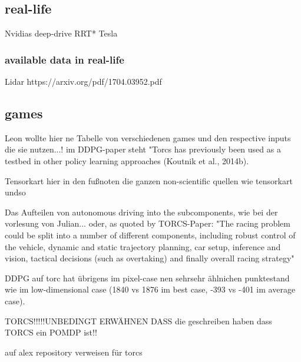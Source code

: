 \subsection{real-life}

Nvidias deep-drive
RRT*
Tesla

\subsubsection{available data in real-life}

Lidar
https://arxiv.org/pdf/1704.03952.pdf


\subsection{games}

Leon wollte hier ne Tabelle von verschiedenen games und den respective inputs die sie nutzen...!
im DDPG-paper steht "Torcs has previously been used as a testbed in other
policy learning approaches (Koutnik et al., 2014b).

\begin{table}
\end{table}

Tensorkart
hier in den fußnoten die ganzen non-scientific quellen wie tensorkart undso

Das Aufteilen von autonomous driving into the subcomponents, wie bei der vorlesung von Julian... oder, as quoted by TORCS-Paper: "The racing problem could be split into a number of different components, including robust control of the vehicle, dynamic and static trajectory planning, car setup, inference and vision, tactical decisions (such as overtaking) and finally overall racing strategy"

DDPG auf torc hat übrigens im pixel-case nen sehrsehr ählnichen punktestand wie im low-dimensional case (1840 vs 1876 im best case, -393 vs -401 im average case).


TORCS!!!!!UNBEDINGT ERWÄHNEN DASS die geschreiben haben dass TORCS ein POMDP ist!!

auf alex repository verweisen für torcs